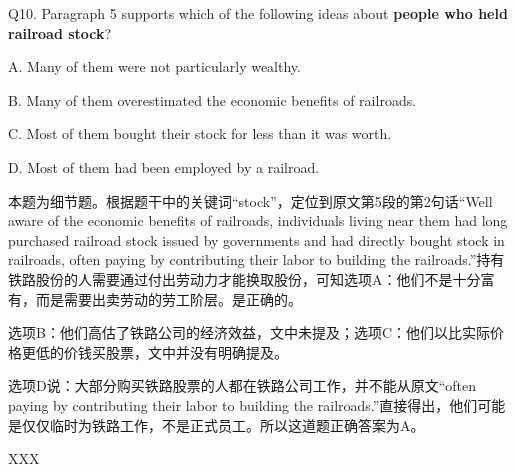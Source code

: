 \begin{blk}
    \begin{qst}
        Q10. Paragraph 5 supports which of the following ideas about \textbf{people who held railroad stock}?
    \end{qst}

    \begin{chc}
        A. Many of them were not particularly wealthy.

        B. Many of them overestimated the economic benefits of railroads.

        C. Most of them bought their stock for less than it was worth.

        D. Most of them had been employed by a railroad.
    \end{chc}

    \begin{psgq}
        本题为细节题。根据题干中的关键词“stock”，定位到原文第5段的第2句话“Well aware of the economic benefits of railroads, individuals living near them had long purchased railroad stock issued by governments and had directly bought stock in railroads, often paying by contributing their labor to building the railroads.”持有铁路股份的人需要通过付出劳动力才能换取股份，可知选项A：他们不是十分富有，而是需要出卖劳动的劳工阶层。是正确的。

        选项B：他们高估了铁路公司的经济效益，文中未提及；选项C：他们以比实际价格更低的价钱买股票，文中并没有明确提及。

        选项D说：大部分购买铁路股票的人都在铁路公司工作，并不能从原文“often paying by contributing their labor to building the railroads.”直接得出，他们可能是仅仅临时为铁路工作，不是正式员工。所以这道题正确答案为A。
    \end{psgq}

    \begin{nlz}
        XXX
    \end{nlz}
\end{blk}

